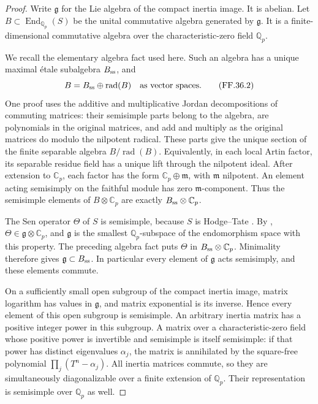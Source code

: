 \begin{proof}
Write \(\mathfrak g\) for the Lie algebra of
the compact inertia image. It is abelian.
Let \(B\subset\operatorname{End}_{\mathbb Q_p}(S)\)
be the unital commutative algebra generated by
\(\mathfrak g\). It is a finite-dimensional
commutative algebra over the characteristic-zero
field \(\mathbb Q_p\).

We recall the elementary algebra fact used
here. Such an algebra has a unique maximal
\'etale subalgebra \(B_{\rm ss}\), and
\[
           B=B_{\rm ss}\oplus\operatorname{rad}(B)
                         \quad\text{as vector spaces}.
                                                        \tag{FF.36.2}
\]
One proof uses the additive and multiplicative
Jordan decompositions of commuting matrices:
their semisimple parts belong to the algebra,
are polynomials in the original matrices, and
add and multiply as the original matrices do
modulo the nilpotent radical. These parts
give the unique section of the finite separable
algebra \(B/\operatorname{rad}(B)\). Equivalently,
in each local Artin factor, its separable residue
field has a unique lift through the nilpotent
ideal. After extension to \(\mathbb C_p\),
each factor has the form
\(\mathbb C_p\oplus\mathfrak m\), with
\(\mathfrak m\) nilpotent. An element acting
semisimply on the faithful module has zero
\(\mathfrak m\)-component. Thus the semisimple
elements of \(B\otimes\mathbb C_p\) are exactly
\(B_{\rm ss}\otimes\mathbb C_p\).

The Sen operator \(\Theta\) of \(S\) is
semisimple, because \(S\) is Hodge--Tate
\citep[Section~2.7]{FF_Fontaine2004}.
By \citet[Theorem~3.1, \(d=0\)]{FF_Ohkubo2014},
\(\Theta\in\mathfrak g\otimes\mathbb C_p\),
and \(\mathfrak g\) is the smallest
\(\mathbb Q_p\)-subspace of the endomorphism
space with this property. The preceding
algebra fact puts \(\Theta\) in
\(B_{\rm ss}\otimes\mathbb C_p\). Minimality
therefore gives \(\mathfrak g\subset B_{\rm ss}\).
In particular every element of \(\mathfrak g\)
acts semisimply, and these elements commute.

On a sufficiently small open subgroup of
the compact inertia image, matrix logarithm
has values in \(\mathfrak g\), and matrix
exponential is its inverse. Hence every
element of this open subgroup is semisimple.
An arbitrary inertia matrix has a positive
integer power in this subgroup. A matrix
over a characteristic-zero field whose
positive power is invertible and semisimple
is itself semisimple: if that power has
distinct eigenvalues \(\alpha_j\), the
matrix is annihilated by the square-free
polynomial \(\prod_j(T^n-\alpha_j)\).
All inertia matrices commute, so they are
simultaneously diagonalizable over a finite
extension of \(\mathbb Q_p\). Their
representation is semisimple over
\(\mathbb Q_p\) as well.


\end{proof}
